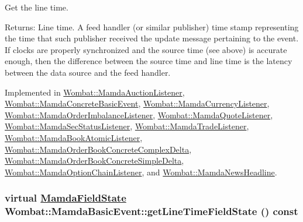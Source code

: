 Get the line time. 

\begin{Desc}
\item[Returns:]Line time. A feed handler (or similar publisher) time stamp representing the time that such publisher received the update message pertaining to the event. If clocks are properly synchronized and the source time (see above) is accurate enough, then the difference between the source time and line time is the latency between the data source and the feed handler. \end{Desc}


Implemented in \hyperlink{classWombat_1_1MamdaAuctionListener_e9c0fa0d65584e373f0e645566428a8e}{Wombat::Mamda\-Auction\-Listener}, \hyperlink{classWombat_1_1MamdaConcreteBasicEvent_a1859e79dc57601841701399a7aad8eb}{Wombat::Mamda\-Concrete\-Basic\-Event}, \hyperlink{classWombat_1_1MamdaCurrencyListener_1f9fa224749c87c92668bf55bcb2cfa5}{Wombat::Mamda\-Currency\-Listener}, \hyperlink{classWombat_1_1MamdaOrderImbalanceListener_39ab83f80c21af82d0327dbb11a517d3}{Wombat::Mamda\-Order\-Imbalance\-Listener}, \hyperlink{classWombat_1_1MamdaQuoteListener_4aa61f82eb9452a38d2c483a5626b8b1}{Wombat::Mamda\-Quote\-Listener}, \hyperlink{classWombat_1_1MamdaSecStatusListener_e879990d8f32b1f28f5ab2fa5e20f441}{Wombat::Mamda\-Sec\-Status\-Listener}, \hyperlink{classWombat_1_1MamdaTradeListener_1bdc7c259fc34f4e4e43e2e97953ba97}{Wombat::Mamda\-Trade\-Listener}, \hyperlink{classWombat_1_1MamdaBookAtomicListener_e390bbef9be51d4e4a63f3c7bab42926}{Wombat::Mamda\-Book\-Atomic\-Listener}, \hyperlink{classWombat_1_1MamdaOrderBookConcreteComplexDelta_e3492571a52dbdbfd47f21da84a38c33}{Wombat::Mamda\-Order\-Book\-Concrete\-Complex\-Delta}, \hyperlink{classWombat_1_1MamdaOrderBookConcreteSimpleDelta_21b2f8800eceb76e80b9f1b445666681}{Wombat::Mamda\-Order\-Book\-Concrete\-Simple\-Delta}, \hyperlink{classWombat_1_1MamdaOptionChainListener_4d3d107d4aea29b42a262071c0a4d0ed}{Wombat::Mamda\-Option\-Chain\-Listener}, and \hyperlink{classWombat_1_1MamdaNewsHeadline_e32eaf99ac790130beb93eb03ad2b562}{Wombat::Mamda\-News\-Headline}.\hypertarget{classWombat_1_1MamdaBasicEvent_eb06352aca3280c5e89bad7a3b185cdf}{
\subsubsection[getLineTimeFieldState]{\setlength{\rightskip}{0pt plus 5cm}virtual \hyperlink{namespaceWombat_93aac974f2ab713554fd12a1fa3b7d2a}{Mamda\-Field\-State} Wombat::Mamda\-Basic\-Event::get\-Line\-Time\-Field\-State () const}}
\label{classWombat_1_1MamdaBasicEvent_eb06352aca3280c5e89bad7a3b185cdf}


